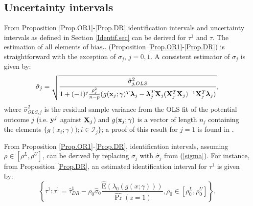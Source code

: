 \documentclass[11pt]{article}
\newcommand{\E}{{\mbox{E}}}
\newcommand{\x}{{\bf x}}
\newcommand{\X}{{\bf X}}
\newcommand{\y}{{\bf y}}
\newcommand{\blambda}{\boldsymbol \lambda}
\newcommand{\bias}{\mbox{bias}}
\begin{document}
%


\subsection{Uncertainty intervals}
From Proposition \ref{Prop.OR1}-\ref{Prop.DR} identification intervals and uncertainty intervals as defined in Section \ref{Identif.sec} can be derived for $\tau^1$ and $\tau$. The estimation of all elements of $\bias_C$ (Proposition \ref{Prop.OR1}-\ref{Prop.DR}) is straightforward with the exception of $\sigma_j$, $j=0,1$. A consistent estimator of $\sigma_j$ is given by:
\begin{equation}
\hat \sigma_j=\sqrt{\frac{\hat \sigma_{j, OLS}^2}{1+ (-1)^j \frac{\rho_j^2}{n-p} (g(\x_j; \gamma)^T \blambda_j-\blambda_j^T \X_j (\X_j^T \X_j)^{-1}\X_j^T \blambda_j )}},
\label{sigma}
\end {equation}
where ${\hat \sigma_{OLS,j}^2}$ is the residual sample variance from the OLS fit of the potential outcome $j$ (i.e. $\y^j$ against $\X_j$) and $g(\x_j; \gamma)$ is a vector of length $n_j$ containing the elements $\{g(x_i; \gamma)) ; i \in \mathcal{I}_j\} $; a proof of this result for $j=1$ is found in \citet[page 9]{Tanja}.

From Proposition \ref{Prop.OR1}-\ref{Prop.DR}, identification intervals, assuming $\rho \in [\rho^L, \rho^U]$, can be derived by replacing $\sigma_j$ with $\hat \sigma_j$ from (\ref{sigma}). For instance, from Proposition \ref{Prop.DR}, an estimated identification interval for $\tau^1$ is given by:
\begin{equation*}
\left\{  \tau^1 : \tau^1=\hat \tau^1_{DR} -  \rho_0 \hat\sigma_{0}\frac{\hat\E(\lambda_0(g(x; \gamma)))}{\widehat{\Pr}(z=1)}  , \rho_0 \in [\rho_0^L,\rho_0^U]\right\}.
\label{t1DR.IS}
\end{equation*}
\end{document}
